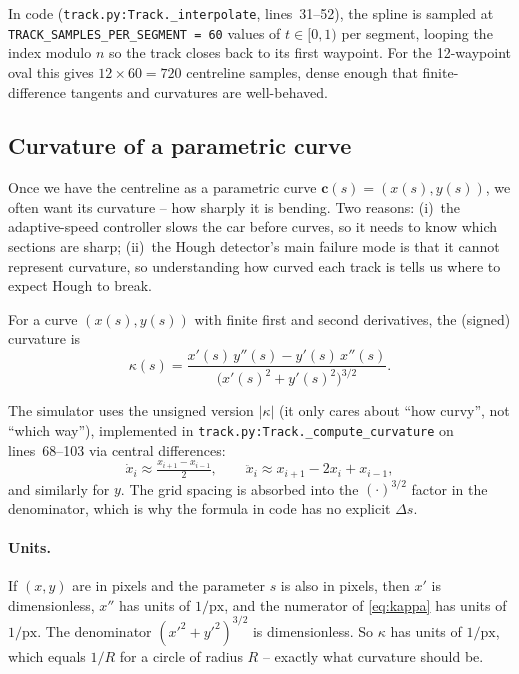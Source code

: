 In code (\texttt{track.py:Track.\_interpolate}, lines~31--52), the
spline is sampled at \texttt{TRACK\_SAMPLES\_PER\_SEGMENT~=~60} values
of $t\in[0,1)$ per segment, looping the index modulo $n$ so the track
closes back to its first waypoint. For the 12-waypoint oval this gives
$12\times 60 = 720$ centreline samples, dense enough that
finite-difference tangents and curvatures are well-behaved.

\subsection{Curvature of a parametric curve}

Once we have the centreline as a parametric curve $\mathbf{c}(s)=(x(s),y(s))$,
we often want its curvature -- how sharply it is bending. Two reasons:
(i)~the adaptive-speed controller slows the car before curves, so it
needs to know which sections are sharp; (ii)~the Hough detector's
main failure mode is that it cannot represent curvature, so
understanding how curved each track is tells us where to expect Hough
to break.

\begin{definition}
For a curve $(x(s),y(s))$ with finite first and second derivatives,
the (signed) curvature is
\begin{equation}
\kappa(s)=\frac{x'(s)\,y''(s)-y'(s)\,x''(s)}{\bigl(x'(s)^2+y'(s)^2\bigr)^{3/2}}.
\label{eq:kappa}
\end{equation}
\end{definition}

The simulator uses the unsigned version $|\kappa|$ (it only cares
about ``how curvy'', not ``which way''), implemented in
\texttt{track.py:Track.\_compute\_curvature} on lines~68--103 via
central differences:
\[
\dot x_i\approx \tfrac{x_{i+1}-x_{i-1}}{2},\qquad
\ddot x_i\approx x_{i+1}-2x_i+x_{i-1},
\]
and similarly for $y$. The grid spacing is absorbed into the
$(\cdot)^{3/2}$ factor in the denominator, which is why the formula in
code has no explicit $\Delta s$.

\paragraph{Units.}
If $(x,y)$ are in pixels and the parameter $s$ is also in pixels, then
$x'$ is dimensionless, $x''$ has units of $1/\text{px}$, and the
numerator of \eqref{eq:kappa} has units of $1/\text{px}$. The
denominator $(x'^2+y'^2)^{3/2}$ is dimensionless. So $\kappa$ has
units of $1/\text{px}$, which equals $1/R$ for a circle of radius $R$
-- exactly what curvature should be.

